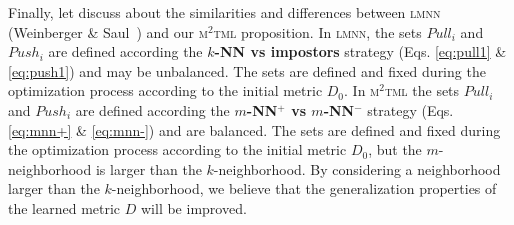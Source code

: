 Finally, let discuss about the similarities and differences between \textsc{lmnn} (Weinberger \& Saul~\cite{Weinberger2009}) and our \textsc{m$^2$tml} proposition. In \textsc{lmnn}, the sets $Pull_i$ and $Push_i$ are defined according the \textbf{$k$-NN vs impostors} strategy (Eqs. \ref{eq:pull1} \& \ref{eq:push1}) and may be unbalanced. The sets are defined and fixed during the optimization process according to the initial metric $D_0$. In \textsc{m$^2$tml} the sets $Pull_i$ and $Push_i$ are defined according the \textbf{$m$-NN$^+$ vs $m$-NN$^-$} strategy (Eqs. \ref{eq:mnn+} \& \ref{eq:mnn-}) and are balanced. The sets are defined and fixed during the optimization process according to the initial metric $D_0$, but the $m$-neighborhood is larger than the $k$-neighborhood. By considering a neighborhood larger than the $k$-neighborhood, we believe that the generalization properties of the learned metric $D$ will be improved. 


